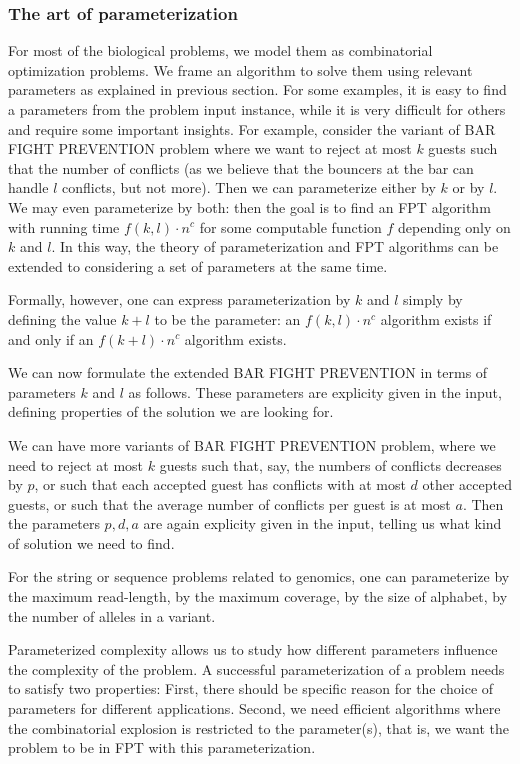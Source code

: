 \subsubsection{The art of parameterization}
For most of the biological problems, we model them as combinatorial optimization problems.
We frame an algorithm to solve them using relevant parameters as explained in previous section.
For some examples, it is easy to find a parameters from the problem input instance, while it is very difficult for others and require some important insights.
For example, consider the variant of BAR FIGHT PREVENTION problem where we want to reject at most $k$ guests
such that the number of conflicts (as we believe that the bouncers at the bar can handle $l$ conflicts, but not more).
Then we can parameterize either by $k$ or by $l$. We may even parameterize by both: then the goal is to find an FPT algorithm with running time $f(k,l) \cdot n^c$ for some computable function $f$
depending only on $k$ and $l$. In this way, the theory of parameterization and FPT algorithms can be extended to considering a set of parameters at the same time.
\begin{definition}
Formally, however, one can express parameterization by $k$ and $l$ simply by defining the value $k+l$ to be the parameter:
an $f(k,l)\cdot n^c$ algorithm exists if and only if an $f(k+l) \cdot n^c$ algorithm exists.
\end{definition}

We can now formulate the extended BAR FIGHT PREVENTION in terms of parameters $k$ and $l$ as follows.
These parameters are explicity given in the input, defining properties of the solution we are looking for.

We can have more variants of BAR FIGHT PREVENTION problem, where we need to reject at most $k$ guests such that,
say, the numbers of conflicts decreases by $p$, or such that each accepted guest has conflicts with at most $d$ other accepted guests,
or such that the average number of conflicts per guest is at most $a$. Then the parameters $p, d, a$ are again explicity given in the input,
telling us what kind of solution we need to find. 

For the string or sequence problems related to genomics, one can parameterize by the maximum read-length, by the maximum coverage,
by the size of alphabet, by the number of alleles in a variant.

Parameterized complexity allows us to study how different parameters influence the complexity of the problem.
A successful parameterization of a problem needs to satisfy two properties:
First, there should be specific reason for the choice of parameters for different applications.
Second, we need efficient algorithms where the combinatorial explosion is restricted to the parameter(s), that is, we want the problem to be in FPT with this parameterization.

